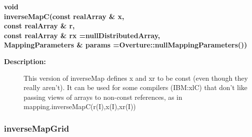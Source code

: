 \begin{flushleft} \textbf{%
void  \\ 
\settowidth{\MappingIncludeArgIndent}{inverseMapC(}%
inverseMapC(const realArray \& x, \\ 
\hspace{\MappingIncludeArgIndent}const realArray \& r, \\ 
\hspace{\MappingIncludeArgIndent}const realArray \& rx  =nullDistributedArray, \\ 
MappingParameters \& params  =Overture::nullMappingParameters())
}\end{flushleft}
\begin{description}
\item[{\bf Description:}] 
   This version of inverseMap defines x and xr to be const (even though they really aren't).
  It can be used for some compilers (IBM:xlC) that don't like passing
   views of arrays to non-const references, as in mapping.inverseMapC(r(I),x(I),xr(I))
\end{description}
\subsubsection{inverseMapGrid}
 
